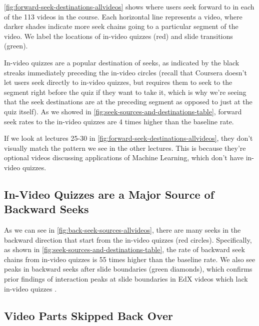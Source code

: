 \documentclass{sigchi}
\begin{document}
\autoref{fig:forward-seek-destinations-allvideos} shows where users seek forward to in each of the 113 videos in the course. Each horizontal line represents a video, where darker shades indicate more seek chains going to a particular segment of the video. We label the locations of in-video quizzes (red) and slide transitions (green). %

In-video quizzes are a popular destination of seeks, as indicated by the black streaks immediately preceding the in-video circles (recall that Coursera doesn't let users seek directly to in-video quizzes, but requires them to seek to the segment right before the quiz if they want to take it, which is why we're seeing that the seek destinations are at the preceding segment as opposed to just at the quiz itself). As we showed in \autoref{fig:seek-sources-and-destinations-table}, forward seek rates to the in-video quizzes are 4 times higher than the baseline rate.

If we look at lectures 25-30 in \autoref{fig:forward-seek-destinations-allvideos}, they don't visually match the pattern we see in the other lectures. This is because they're optional videos discussing applications of Machine Learning, which don't have in-video quizzes. %

\pagebreak

\subsection{In-Video Quizzes are a Major Source of Backward Seeks}

As we can see in \autoref{fig:back-seek-sources-allvideos}, there are many seeks in the backward direction that start from the in-video quizzes (red circles). Specifically, as shown in \autoref{fig:seek-sources-and-destinations-table}, the rate of backward seek chains from in-video quizzes is 55 times higher than the baseline rate. We also see peaks in backward seeks after slide boundaries (green diamonds), which confirms prior findings of interaction peaks at slide boundaries in EdX videos which lack in-video quizzes \cite{juho}.

\subsection{Video Parts Skipped Back Over}
\end{document}
